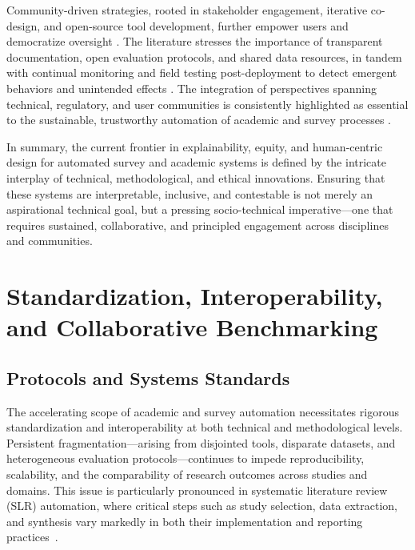 \documentclass[sigconf]{acmart}
\begin{document}
Community-driven strategies, rooted in stakeholder engagement, iterative co-design, and open-source tool development, further empower users and democratize oversight \cite{ref64}\cite{ref70}\cite{ref76}\cite{ref80}\cite{ref100}\cite{ref105}\cite{ref106}. The literature stresses the importance of transparent documentation, open evaluation protocols, and shared data resources, in tandem with continual monitoring and field testing post-deployment to detect emergent behaviors and unintended effects \cite{ref76}\cite{ref80}\cite{ref85}\cite{ref100}\cite{ref105}. The integration of perspectives spanning technical, regulatory, and user communities is consistently highlighted as essential to the sustainable, trustworthy automation of academic and survey processes \cite{ref39}\cite{ref76}\cite{ref83}\cite{ref91}\cite{ref93}\cite{ref99}\cite{ref100}\cite{ref106}.

In summary, the current frontier in explainability, equity, and human-centric design for automated survey and academic systems is defined by the intricate interplay of technical, methodological, and ethical innovations. Ensuring that these systems are interpretable, inclusive, and contestable is not merely an aspirational technical goal, but a pressing socio-technical imperative—one that requires sustained, collaborative, and principled engagement across disciplines and communities.

\section{Standardization, Interoperability, and Collaborative Benchmarking}

\subsection{Protocols and Systems Standards}

The accelerating scope of academic and survey automation necessitates rigorous standardization and interoperability at both technical and methodological levels. Persistent fragmentation—arising from disjointed tools, disparate datasets, and heterogeneous evaluation protocols—continues to impede reproducibility, scalability, and the comparability of research outcomes across studies and domains. This issue is particularly pronounced in systematic literature review (SLR) automation, where critical steps such as study selection, data extraction, and synthesis vary markedly in both their implementation and reporting practices~\cite{ref29,ref37,ref38,ref43,ref61,ref62,ref63,ref68,ref78,ref80,ref86,ref87,ref88,ref89,ref90,ref96,ref98,ref106}.
\end{document}
